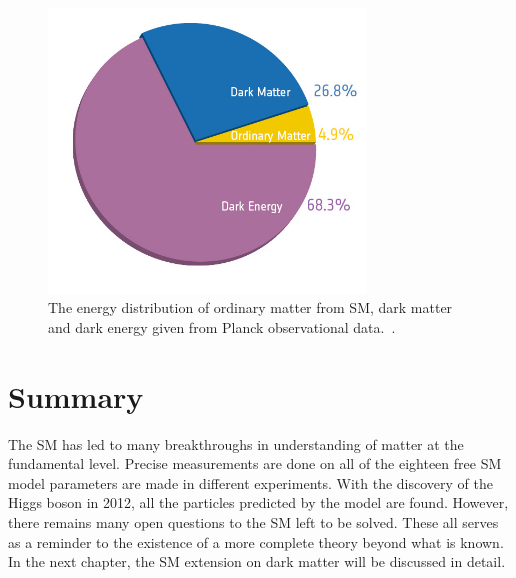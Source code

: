     \begin{figure}[!htb]
        \begin{center}
            \includegraphics[width=0.75\textwidth]{figures/chapter_SM/Planck}
            \caption{
                The energy distribution of ordinary matter from SM, dark matter and dark energy given from Planck observational data.~\cite{ade2016planck}.
            }
            \label{fig:planck}
        \end{center}
    \end{figure}

\section{Summary}
The SM has led to many breakthroughs in understanding of matter at the fundamental level. Precise measurements are done on all of the eighteen free SM model parameters are made in different experiments. With the discovery of the Higgs boson in 2012, all the particles predicted by the model are found. However, there remains many open questions to the SM left to be solved. These all serves as a reminder to the existence of a more complete theory beyond what is known. In the next
chapter, the SM extension on dark matter will be discussed in detail. 




